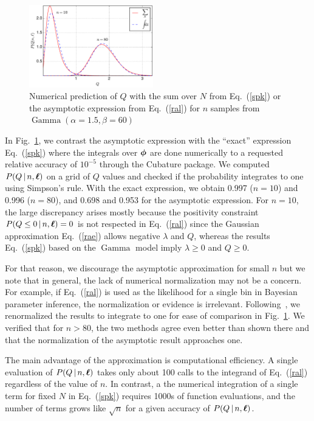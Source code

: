 \documentclass[11pt]{article}
\newcommand{\cond}{\,|\,}
\newcommand{\refeq}[1]{Eq.~(\ref{#1})}
\newcommand{\reffig}[1]{Fig.~\ref{fig:#1}}
\DeclareMathOperator{\GammaDist}{Gamma}
\newcommand{\Lumtot}{Q}
\begin{document}
\begin{figure}[ht]
  \centering
  \includegraphics[width=0.48\textwidth]{asymptotic}
  \caption{Numerical prediction of $\Lumtot$ with the sum over $N$
    from \refeq{spk} or the asymptotic expression from \refeq{ral} for $n$
    samples from $\GammaDist(\alpha=1.5, \beta=60)$}
\label{fig:asymptotic}
\end{figure}

In \reffig{asymptotic}, we contrast the asymptotic expression with the
``exact'' expression \refeq{spk} where the integrals over ${\bm{\phi}}$ are
done numerically to a requested relative accuracy of $10^{-5}$ through
the Cubature
package\cite{cubature,genz1980remarks,berntsen1991adaptive}. We
computed $P(\Lumtot \cond n, \bml)$ on a grid of $\Lumtot$ values and
checked if the probability integrates to one using Simpson's
rule. With the exact expression, we obtain 0.997 ($n=10$) and 0.996
($n=80$), and 0.698 and 0.953 for the asymptotic expression. For
$n=10$, the large discrepancy arises mostly because the positivity
constraint $P(Q \leq 0 \cond n, \bml) = 0$ is not respected in
\refeq{ral} since the Gaussian approximation \refeq{rae} allows
negative $\lambda$ and $\Lumtot$, whereas the results \refeq{spk}
based on the $\GammaDist$ model imply $\lambda \geq 0$ and $Q \geq 0$.

For that reason, we discourage the asymptotic approximation for small
$n$ but we note that in general, the lack of numerical normalization
may not be a concern. For example, if \refeq{ral} is used as the
likelihood for a single bin in Bayesian parameter inference, the
normalization or evidence is
irrelevant. Following~\cite{tierney_accurate_1986}, we renormalized
the results to integrate to one for ease of comparison in
\reffig{asymptotic}.  We verified that for $n>80$, the two methods
agree even better than shown there and that the normalization of the
asymptotic result approaches one.

The main advantage of the approximation is computational efficiency. A
single evaluation of $P(Q \cond n, \bml)$ takes only about 100 calls
to the integrand of \refeq{ral} regardless of the value of $n$. In
contrast, a the numerical integration of a single term for fixed $N$
in \refeq{spk} requires 1000s of function evaluations, and the number
of terms grows like $\sqrt{n}$ for a given accuracy of
$P(Q \cond n, \bml)$.
\end{document}
